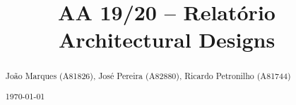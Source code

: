 \documentclass[acmsmall,nonacm,screen]{acmart}
\begin{document}
\title{AA 19/20 -- Relatório Architectural Designs}
\makeatletter \renewcommand{\shortauthors}{\@title} \makeatother

\begin{abstract}
\large
\vspace*{-.8\baselineskip}
João Marques (A81826), José Pereira (A82880), Ricardo Petronilho (A81744)
\vspace*{.4\baselineskip}
\par \noindent \today
\vspace*{.25\baselineskip}
\end{abstract}

\maketitle




\newpage


\newpage

\end{document}
